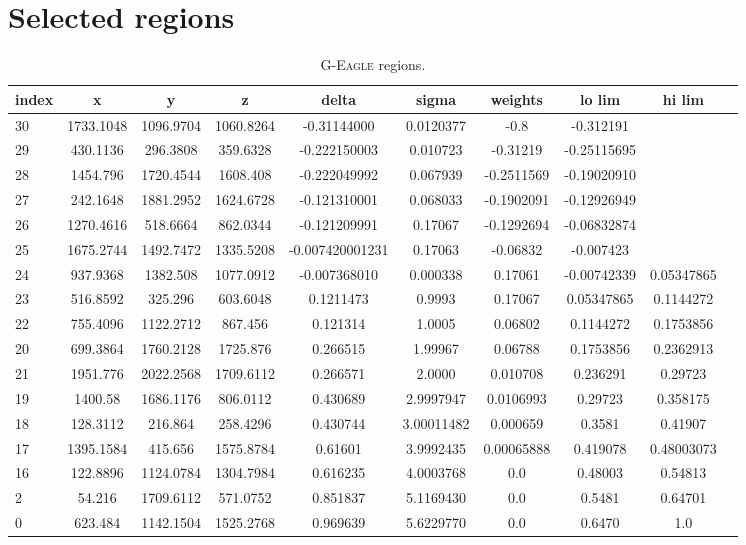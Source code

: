 \section{Selected regions}
\label{sec:regions}


\begin{table*}
	\centering
	\caption{\textsc{G-Eagle} regions.}
	\label{tab:regions}
	\begin{tabular}{lccccccccc} %
		\hline
		index & x & y & z & delta & sigma & weights & lo lim & hi lim\\
		\hline
    30 & 1733.1048 & 1096.9704 & 1060.8264 & -0.31144000 & 0.0120377 & -0.8 & -0.312191 \\
    29 & 430.1136 & 296.3808 & 359.6328 & -0.222150003 & 0.010723 & -0.31219 & -0.25115695 \\
    28 & 1454.796 & 1720.4544 & 1608.408 & -0.222049992 & 0.067939 & -0.2511569 & -0.19020910 \\
    27 & 242.1648 & 1881.2952 & 1624.6728 & -0.121310001 & 0.068033 & -0.1902091 & -0.12926949 \\
    26 & 1270.4616 & 518.6664 & 862.0344 & -0.121209991 & 0.17067 & -0.1292694 & -0.06832874 \\
    25 & 1675.2744 & 1492.7472 & 1335.5208 & -0.007420001231 & 0.17063 & -0.06832 & -0.007423 \\
    24 & 937.9368 & 1382.508 & 1077.0912 & -0.007368010 & 0.000338 & 0.17061 & -0.00742339 & 0.05347865 \\
    23 & 516.8592 & 325.296 & 603.6048 & 0.1211473 & 0.9993 & 0.17067 & 0.05347865 & 0.1144272 \\
    22 & 755.4096 & 1122.2712 & 867.456 & 0.121314 & 1.0005 & 0.06802 & 0.1144272 & 0.1753856 \\
    20 & 699.3864 & 1760.2128 & 1725.876 & 0.266515 & 1.99967 & 0.06788 & 0.1753856 & 0.2362913 \\
    21 & 1951.776 & 2022.2568 & 1709.6112 & 0.266571 & 2.0000 & 0.010708 & 0.236291 & 0.29723 \\
    19 & 1400.58 & 1686.1176 & 806.0112 & 0.430689 & 2.9997947 & 0.0106993 & 0.29723 & 0.358175 \\
    18 & 128.3112 & 216.864 & 258.4296 & 0.430744 & 3.00011482 & 0.000659 & 0.3581 & 0.41907 \\
    17 & 1395.1584 & 415.656 & 1575.8784 & 0.61601 & 3.9992435 & 0.00065888 & 0.419078 & 0.48003073 \\
    16 & 122.8896 & 1124.0784 & 1304.7984 & 0.616235 & 4.0003768 & 0.0 & 0.48003 & 0.54813 \\
    2 & 54.216 & 1709.6112 & 571.0752 & 0.851837 & 5.1169430 & 0.0 & 0.5481 & 0.64701 \\
    0 & 623.484 & 1142.1504 & 1525.2768 & 0.969639 & 5.6229770 & 0.0 & 0.6470 & 1.0 \\
		\hline
	\end{tabular}
\end{table*}

